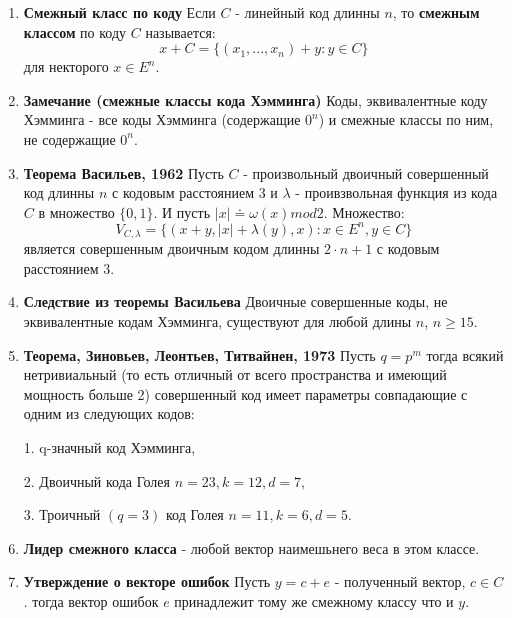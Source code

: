 \documentclass[a4paper, 12pt]{report}
\begin{document}
\begin{enumerate}
\item \textbf{Смежный класс по коду} Если $C$ - линейный код длинны $n$, то \textbf{смежным классом} по коду $C$ называется: 
\[x + C = \lbrace (x_{1}, ..., x_{n}) + y : y\in C\rbrace\] 
для некторого $x \in E^{n}$.

\item \textbf{Замечание (смежные классы кода Хэмминга)} Коды, эквивалентные коду Хэмминга - все коды Хэмминга (содержащие $0^{n}$) и смежные классы по ним, не содержащие $0^{n}$. 

\item \textbf{Теорема Васильев, 1962} Пусть $C$ - произвольный двоичный совершенный код длинны $n$ с кодовым расстоянием $3$ и $\lambda$ - проивзвольная функция из кода $C$ в множество $\lbrace 0,1\rbrace$. И пусть $|x| \doteq \omega(x) mod 2$. Множество:
\[V_{C,\lambda} = \lbrace(x + y, |x| + \lambda(y), x): x\in E^{n}, y \in C\rbrace \]
является совершенным двоичным кодом длинны $2\cdot n + 1$ с кодовым расстоянием $3$.

\item \textbf{Следствие из теоремы Васильева} Двоичные совершенные коды, не эквивалентные кодам Хэмминга, существуют для любой длины $n$, $n\geq 15$.

\item \textbf{Теорема, Зиновьев, Леонтьев, Титвайнен, 1973}
Пусть $q = p^m$ тогда всякий  нетривиальный (то есть отличный от всего пространства и имеющий мощность больше 2) совершенный код имеет параметры совпадающие с одним из следующих кодов:

1. q-значный код Хэмминга,

2. Двоичный кода Голея $n = 23, k = 12, d = 7$,

3. Троичный $(q = 3)$ код Голея $n = 11, k = 6, d = 5$.

\item \textbf{Лидер смежного класса} - любой вектор наимешьнего веса в этом классе.

\item \textbf{Утверждение о векторе ошибок} Пусть $y = c + e$ - полученный вектор, $c\in C$. тогда вектор ошибок $e$ принадлежит тому же смежному классу что и $y$.

\end{enumerate}
\end{document}
